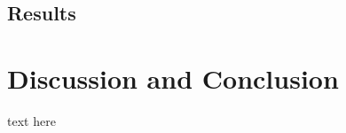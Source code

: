 \documentclass{llncs}
\begin{document}
\subsection{Results}

\section{Discussion and Conclusion}
text here


{}


%
%
%
%
%
%
%
%
%
%
%
%


\end{document}
